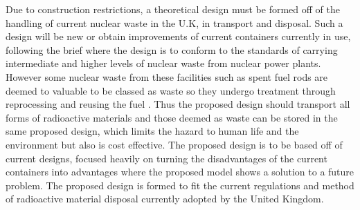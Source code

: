 Due to construction restrictions, a theoretical design must be formed off of the handling of current nuclear waste in the U.K, in transport and disposal. Such a design will be new or obtain improvements of current containers currently in use, following the brief where the design is to conform to the standards of carrying intermediate and higher levels of nuclear waste from nuclear power plants. However some nuclear waste from these facilities such as spent fuel rods are deemed to valuable to be classed as waste so they undergo treatment through reprocessing and reusing the fuel \cite{ManageNuclearWaste}. Thus the proposed design should transport all forms of radioactive materials and those deemed as waste can be stored in the same proposed design, which limits the hazard to human life and the environment but also is cost effective. The proposed design is to be based off of current designs, focused heavily on turning the disadvantages of the current containers into advantages where the proposed model shows a solution to a future problem. The proposed design is formed to fit the current regulations and method of radioactive material disposal currently adopted by the United Kingdom.